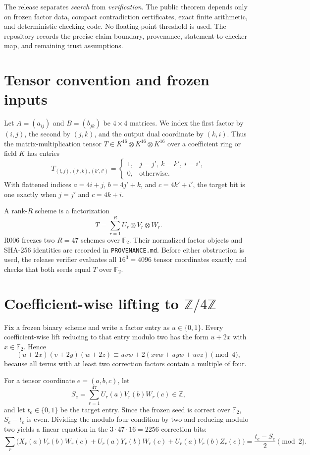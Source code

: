 \documentclass[11pt]{article}
\newcommand{\F}{\mathbb{F}}
\newcommand{\Z}{\mathbb{Z}}
\begin{document}
The release separates \emph{search} from \emph{verification}. The public theorem depends only on frozen factor data, compact contradiction certificates, exact finite arithmetic, and deterministic checking code. No floating-point threshold is used. The repository records the precise claim boundary, provenance, statement-to-checker map, and remaining trust assumptions.

\section{Tensor convention and frozen inputs}

Let $A=(a_{ij})$ and $B=(b_{jk})$ be $4\times4$ matrices. We index the first factor by $(i,j)$, the second by $(j,k)$, and the output dual coordinate by $(k,i)$. Thus the matrix-multiplication tensor $T\in K^{16}\otimes K^{16}\otimes K^{16}$ over a coefficient ring or field $K$ has entries
\[
T_{(i,j),(j',k),(k',i')}=
\begin{cases}
1,&j=j',\ k=k',\ i=i',\\
0,&\text{otherwise.}
\end{cases}
\]
With flattened indices $a=4i+j$, $b=4j'+k$, and $c=4k'+i'$, the target bit is one exactly when $j=j'$ and $c=4k+i$.

A rank-$R$ scheme is a factorization
\[
T=\sum_{r=1}^{R}U_r\otimes V_r\otimes W_r.
\]
R006 freezes two $R=47$ schemes over $\F_2$. Their normalized factor objects and SHA-256 identities are recorded in \texttt{PROVENANCE.md}. Before either obstruction is used, the release verifier evaluates all $16^3=4096$ tensor coordinates exactly and checks that both seeds equal $T$ over $\F_2$.

\section{Coefficient-wise lifting to $\Z/4\Z$}

Fix a frozen binary scheme and write a factor entry as $u\in\{0,1\}$. Every coefficient-wise lift reducing to that entry modulo two has the form $u+2x$ with $x\in\F_2$. Hence
\[
(u+2x)(v+2y)(w+2z)
\equiv uvw+2(xvw+uyw+uvz)\pmod 4,
\]
because all terms with at least two correction factors contain a multiple of four.

For a tensor coordinate $e=(a,b,c)$, let
\[
S_e=\sum_{r=1}^{47}U_r(a)V_r(b)W_r(c)\in\Z,
\]
and let $t_e\in\{0,1\}$ be the target entry. Since the frozen seed is correct over $\F_2$, $S_e-t_e$ is even. Dividing the modulo-four condition by two and reducing modulo two yields a linear equation in the $3\cdot47\cdot16=2256$ correction bits:
\[
\sum_r\bigl(X_r(a)V_r(b)W_r(c)+U_r(a)Y_r(b)W_r(c)+U_r(a)V_r(b)Z_r(c)\bigr)
=\frac{t_e-S_e}{2}\pmod2.
\]
\end{document}
